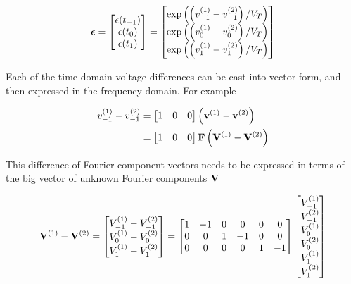 \begin{equation}\label{eqn:ece1254projectReport:980}
\begin{aligned}
\Bepsilon &=
\begin{bmatrix}
\epsilon(t_{-1}) \\
\epsilon(t_{0}) \\
\epsilon(t_{1}) \\
\end{bmatrix}
=
\begin{bmatrix}
\exp\lr{ \lr{ v^{(1)}_{-1} - v^{(2)}_{-1} }/V_T } \\
\exp\lr{ \lr{ v^{(1)}_{0} - v^{(2)}_{0} }/V_T } \\
\exp\lr{ \lr{ v^{(1)}_{1} - v^{(2)}_{1} }/V_T }
\end{bmatrix} \\
\end{aligned}
\end{equation}

Each of the time domain voltage differences can be cast into vector form, and then expressed in the frequency domain.
For example

\begin{equation}\label{eqn:ece1254projectReport:1380}
\begin{aligned}
v^{(1)}_{-1} - v^{(2)}_{-1}
&=
\begin{bmatrix}
1 & 0 & 0
\end{bmatrix}
\lr{ \Bv^{(1)} - \Bv^{(2)} } \\
&=
\begin{bmatrix}
1 & 0 & 0
\end{bmatrix}
\BF
\lr{ \BV^{(1)} - \BV^{(2)} }
\end{aligned}
\end{equation}

This difference of Fourier component vectors needs to be expressed in terms of the big vector of unknown Fourier components \( \mathbf{V} \)

\begin{dmath}\label{eqn:ece1254projectReport:1000}
\BV^{(1)} - \BV^{(2)}
=
\begin{bmatrix}
V^{(1)}_{-1} - V^{(2)}_{-1} \\
V^{(1)}_{0} - V^{(2)}_{0} \\
V^{(1)}_{1} - V^{(2)}_{1} \\
\end{bmatrix}
=
\begin{bmatrix}
1 & -1 & 0 & 0 & 0 & 0 \\
0 &  0 & 1 & -1 & 0 & 0 \\
0 &  0 & 0 & 0 & 1 & -1 \\
\end{bmatrix}
\begin{bmatrix}
V_{-1}^{(1)} \\
V_{-1}^{(2)} \\
V_{0}^{(1)} \\
V_{0}^{(2)} \\
V_{1}^{(1)} \\
V_{1}^{(2)} \\
\end{bmatrix}
\end{dmath}

